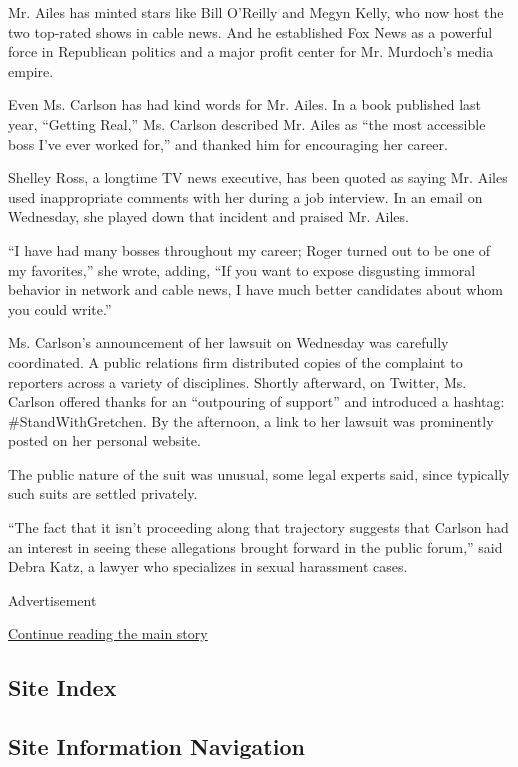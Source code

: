 Mr. Ailes has minted stars like Bill O'Reilly and Megyn Kelly, who now
host the two top-rated shows in cable news. And he established Fox News
as a powerful force in Republican politics and a major profit center for
Mr. Murdoch's media empire.

Even Ms. Carlson has had kind words for Mr. Ailes. In a book published
last year, ``Getting Real,'' Ms. Carlson described Mr. Ailes as ``the
most accessible boss I've ever worked for,'' and thanked him for
encouraging her career.

Shelley Ross, a longtime TV news executive, has been quoted as saying
Mr. Ailes used inappropriate comments with her during a job interview.
In an email on Wednesday, she played down that incident and praised Mr.
Ailes.

``I have had many bosses throughout my career; Roger turned out to be
one of my favorites,'' she wrote, adding, ``If you want to expose
disgusting immoral behavior in network and cable news, I have much
better candidates about whom you could write.''

Ms. Carlson's announcement of her lawsuit on Wednesday was carefully
coordinated. A public relations firm distributed copies of the complaint
to reporters across a variety of disciplines. Shortly afterward, on
Twitter, Ms. Carlson offered thanks for an ``outpouring of support'' and
introduced a hashtag: \#StandWithGretchen. By the afternoon, a link to
her lawsuit was prominently posted on her personal website.

The public nature of the suit was unusual, some legal experts said,
since typically such suits are settled privately.

``The fact that it isn't proceeding along that trajectory suggests that
Carlson had an interest in seeing these allegations brought forward in
the public forum,'' said Debra Katz, a lawyer who specializes in sexual
harassment cases.

Advertisement

\protect\hyperlink{after-bottom}{Continue reading the main story}

\hypertarget{site-index}{%
\subsection{Site Index}\label{site-index}}

\hypertarget{site-information-navigation}{%
\subsection{Site Information
Navigation}\label{site-information-navigation}}

